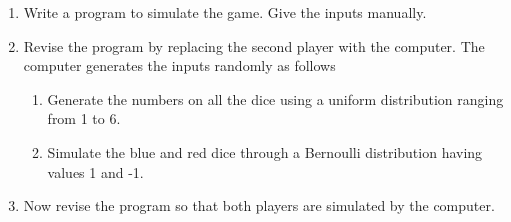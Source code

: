 \begin{enumerate}[label=\thesection.\arabic*, ref=\thesection.\theenumi,resume*]
	\item Write a program to simulate the game.  Give the inputs manually.
	\\
	\solution 
	
	\item Revise the program by replacing the second player with the computer.  The computer generates the inputs randomly as follows 
		\begin{enumerate}
			\item Generate the numbers on all the dice using a uniform distribution ranging from 1 to 6.
			\item Simulate the blue and red dice through a Bernoulli distribution having values 1 and -1.
		\end{enumerate}
	\solution 
	
\item Now revise the program so that both players are simulated by the computer.
\end{enumerate}
